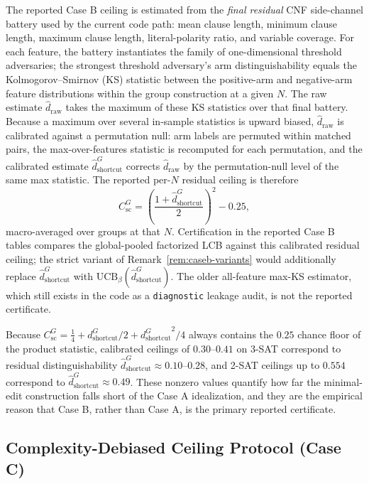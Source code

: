 \documentclass[conference]{IEEEtran}
\theoremstyle{remark}
\newcommand{\UCB}{\mathrm{UCB}}
\newcommand{\shortcutDisc}{d_{\mathrm{shortcut}}^{G}}
\newcommand{\hatshortcutDisc}{\hat d_{\mathrm{shortcut}}^{G}}
\newcommand{\shortcutCeiling}{C_{\mathrm{sc}}^{G}}
\begin{document}
The reported Case B ceiling is estimated from the \emph{final residual} CNF side-channel battery used by the current code path: mean clause length, minimum clause length, maximum clause length, literal-polarity ratio, and variable coverage.
For each feature, the battery instantiates the family of one-dimensional threshold adversaries; the strongest threshold adversary's arm distinguishability equals the Kolmogorov--Smirnov (KS) statistic between the positive-arm and negative-arm feature distributions within the group construction at a given $N$.
The raw estimate $\hat{d}_{\mathrm{raw}}$ takes the maximum of these KS statistics over that final battery.
Because a maximum over several in-sample statistics is upward biased, $\hat{d}_{\mathrm{raw}}$ is calibrated against a permutation null: arm labels are permuted within matched pairs, the max-over-features statistic is recomputed for each permutation, and the calibrated estimate $\hatshortcutDisc$ corrects $\hat{d}_{\mathrm{raw}}$ by the permutation-null level of the same max statistic.
The reported per-$N$ residual ceiling is therefore
\[
\shortcutCeiling
=
\left(\frac{1+\hatshortcutDisc}{2}\right)^2-0.25,
\]
macro-averaged over groups at that $N$.
Certification in the reported Case B tables compares the global-pooled factorized LCB against this calibrated residual ceiling; the strict variant of Remark~\ref{rem:caseb-variants} would additionally replace $\hatshortcutDisc$ with $\UCB_{\beta}(\hatshortcutDisc)$.  The older all-feature max-KS estimator, which still exists in the code as a \texttt{diagnostic} leakage audit, is not the reported certificate.

Because $\shortcutCeiling=\tfrac{1}{4}+\shortcutDisc/2+{\shortcutDisc}^{2}/4$ always contains the $0.25$ chance floor of the product statistic, calibrated ceilings of $0.30$--$0.41$ on 3-SAT correspond to residual distinguishability $\hatshortcutDisc\approx0.10$--$0.28$, and 2-SAT ceilings up to $0.554$ correspond to $\hatshortcutDisc\approx0.49$.
These nonzero values quantify how far the minimal-edit construction falls short of the Case A idealization, and they are the empirical reason that Case B, rather than Case A, is the primary reported certificate.

\subsection{Complexity-Debiased Ceiling Protocol (Case C)}
\label{sec:ceiling_estimation_casec}
\end{document}
